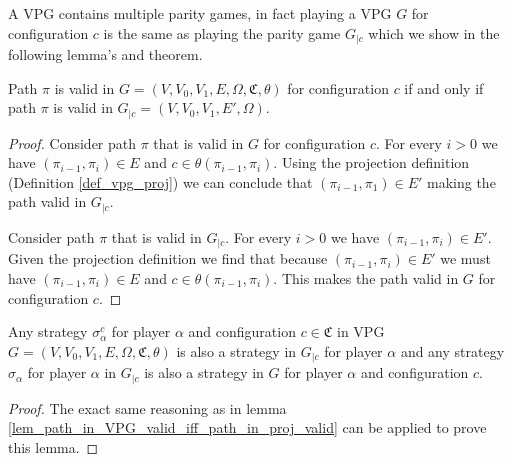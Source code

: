 A VPG contains multiple parity games, in fact playing a VPG $G$ for configuration $c$ is the same as playing the parity game $G_{|c}$ which we show in the following lemma's and theorem.

\begin{lemma}
	\label{lem_path_in_VPG_valid_iff_path_in_proj_valid}
	Path $\pi$ is valid in $G = (V,V_0,V_1,E,\Omega,\mathfrak{C},\theta)$ for configuration $c$ if and only if path $\pi$ is valid in $G_{|c} = (V,V_0,V_1,E',\Omega)$.
	\begin{proof}
		Consider path $\pi$ that is valid in $G$ for configuration $c$. For every $i>0$ we have $(\pi_{i-1},\pi_i) \in E$ and $c \in \theta(\pi_{i-1},\pi_i)$. Using the projection definition (Definition \ref{def_vpg_proj}) we can conclude that $(\pi_{i-1},\pi_1) \in E'$ making the path valid in $G_{|c}$.
		
		Consider path $\pi$ that is valid in $G_{|c}$. For every $i > 0$ we have $(\pi_{i-1},\pi_i) \in E'$. Given the projection definition we find that because $(\pi_{i-1},\pi_i) \in E'$ we must have $(\pi_{i-1},\pi_i) \in E$ and $c \in \theta(\pi_{i-1},\pi_i)$. This makes the path valid in $G$ for configuration $c$.
	\end{proof}
\end{lemma}

\begin{lemma}
	\label{lem_start_in_VPG_valid_iff_start_in_proj_valid}
	Any strategy $\sigma_\alpha^c$ for player $\alpha$ and configuration $c \in \mathfrak{C}$ in VPG $G = (V,V_0,V_1,E,\Omega,\mathfrak{C},\theta)$ is also a strategy in $G_{|c}$ for player $\alpha$ and any strategy $\sigma_\alpha$ for player $\alpha$ in $G_{|c}$ is also a strategy in $G$ for player $\alpha$ and configuration $c$.
	\begin{proof}
		The exact same reasoning as in lemma \ref{lem_path_in_VPG_valid_iff_path_in_proj_valid} can be applied to prove this lemma.
	\end{proof}
\end{lemma}


